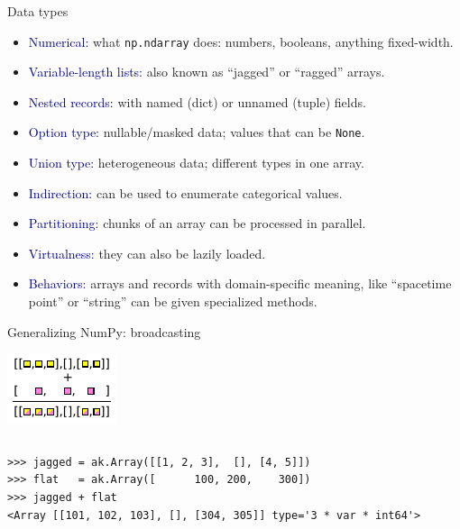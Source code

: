 \documentclass[aspectratio=169]{beamer}
\begin{document}
\begin{frame}{Data types }
\Large
\vspace{0.2 cm}

\begin{itemize}
\item<1-> \textcolor{darkblue}{Numerical:} what \texttt{np.ndarray} does: numbers, booleans, anything fixed-width.
\item<2-> \textcolor{darkblue}{Variable-length lists:} also known as ``jagged'' or ``ragged'' arrays.
\item<3-> \textcolor{darkblue}{Nested records:} with named (dict) or unnamed (tuple) fields.
\item<4-> \textcolor{darkblue}{Option type:} nullable/masked data; values that can be \texttt{None}.
\item<5-> \textcolor{darkblue}{Union type:} heterogeneous data; different types in one array.
\end{itemize}

\vspace{0.25 cm}
\begin{itemize}
\item<6-> \textcolor{darkblue}{Indirection:} can be used to enumerate categorical values.
\item<7-> \textcolor{darkblue}{Partitioning:} chunks of an array can be processed in parallel.
\item<8-> \textcolor{darkblue}{Virtualness:} they can also be lazily loaded.
\item<9-> \textcolor{darkblue}{Behaviors:} arrays and records with domain-specific meaning, like ``spacetime point'' or ``string'' can be given specialized methods.
\end{itemize}
\end{frame}

\begin{frame}[fragile]{Generalizing NumPy: broadcasting}
\begin{center}
\includegraphics[width=0.4\linewidth]{img/cartoon-broadcasting.pdf}
\end{center}

\begin{columns}
\begin{verbatim}
>>> jagged = ak.Array([[1, 2, 3],  [], [4, 5]])
>>> flat   = ak.Array([      100, 200,    300])
>>> jagged + flat
<Array [[101, 102, 103], [], [304, 305]] type='3 * var * int64'>
\end{verbatim}
\end{columns}
\end{frame}
\end{document}
